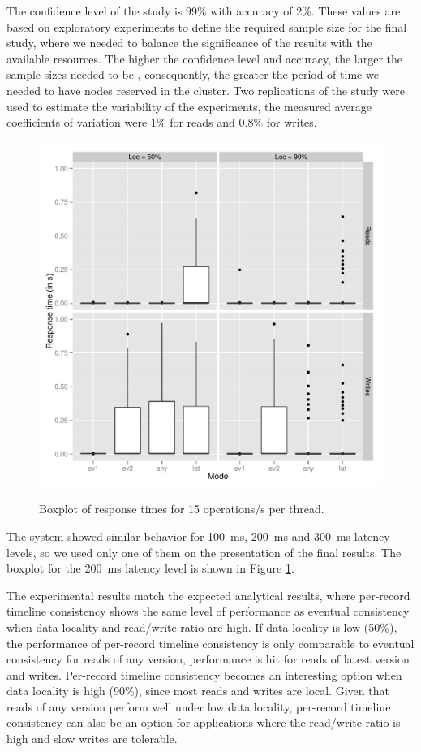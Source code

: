 \documentclass[man,floatsintext,12pt]{apa6}
\begin{document}
The confidence level of the study is 99\% with accuracy of 2\%. These values
are based on exploratory experiments to define the required sample size for the
final study, where we needed to balance the significance of the results with
the available resources. The higher the confidence level and accuracy, the
larger the sample sizes needed to be \parencite{Jain1991}, consequently, the
greater the period of time we needed to have nodes reserved in the cluster. Two
replications of the study were used to estimate the variability of the
experiments, the measured average coefficients of variation were 1\% for reads
and 0.8\% for writes.

\begin{figure}[h!]
\caption{Boxplot of response times for 15 operations/s per thread.}
\includegraphics[width=1.0\textwidth]{boxplot200.png}
\label{fig:boxplot_dos_tempos_de_resposta}
\end{figure}

The system showed similar behavior for 100~ms, 200~ms and 300~ms latency
levels, so we used only one of them on the presentation of the final results.
The boxplot for the 200~ms latency level is shown in Figure
\ref{fig:boxplot_dos_tempos_de_resposta}.

The experimental results match the expected analytical results, where
per-record timeline consistency shows the same level of performance as eventual
consistency when data locality and read/write ratio are high.  If data locality
is low (50\%), the performance of per-record timeline consistency is only
comparable to eventual consistency for reads of any version, performance is hit
for reads of latest version and writes.  Per-record timeline consistency
becomes an interesting option when data locality is high (90\%), since most
reads and writes are local. Given that reads of any version perform well under
low data locality, per-record timeline consistency can also be an option for
applications where the read/write ratio is high and slow writes are tolerable.
\end{document}
